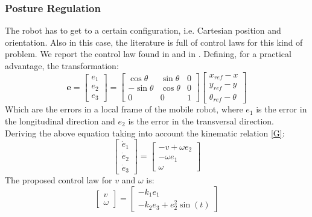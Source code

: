 \subsubsection{Posture Regulation}
The robot has to get to a certain configuration, i.e. Cartesian position and orientation. 
Also in this case, the literature is full of control laws for this kind of problem. We report the control law found in \cite{dixon} and in \cite{samson}.
Defining, for a practical advantage, the transformation:
\begin{equation} \label{trackingerrortransformation}
 	\mathbf{e}=
 	\left[\begin{matrix}
		e_1\\e_2\\e_3
	\end{matrix}\right] = 
	\left[\begin{matrix}
		\cos\theta & \sin\theta & 0 \\
		-\sin\theta & \cos\theta & 0 \\
		0 & 0 & 1
	\end{matrix}\right]
	\left[\begin{matrix}
	x_{ref}-x\\y_{ref}-y\\\theta_{ref}-\theta
	\end{matrix}\right]
\end{equation}
Which are the errors in a local frame of the mobile robot, where $e_1$ is the error in the longitudinal direction and $e_2$ is the error in the transversal direction.\\ Deriving the above equation taking into account the kinematic relation \ref{G}:
\begin{equation}
	\left[\begin{matrix}
		\dot{e}_1\\\dot{e}_2\\\dot{e}_3
	\end{matrix}\right] = 
	\left[\begin{matrix}
		-v+\omega e_2\\-\omega e_1\\\omega
	\end{matrix}\right]
\end{equation}
The proposed control law for $v$ and $\omega$ is:
\begin{equation}
	\left[\begin{matrix}
	v\\\omega
	\end{matrix}\right] = 
	\left[\begin{matrix}
	-k_1e_1\\-k_2e_3+e_2^2\sin(t)
	\end{matrix}\right]
\end{equation}
